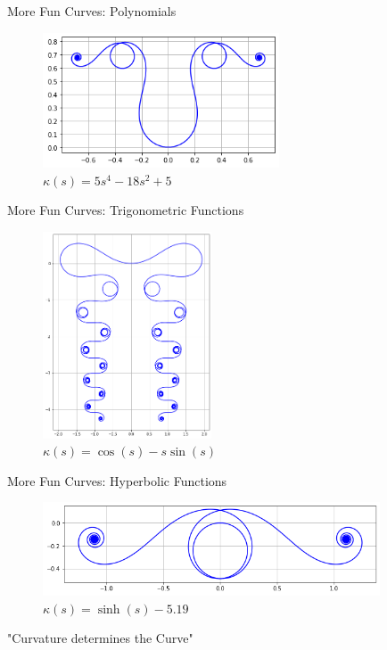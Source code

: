\documentclass{beamer}
\begin{document}
\begin{frame}{More Fun Curves: Polynomials}
	\begin{figure}
		\caption{$\kappa(s) = 5 s ^ 4 - 18 s ^ 2 + 5$}
		\centering
		\includegraphics[width=70mm, scale=0.5]{five_s^4.png}
	\end{figure}
\end{frame}

\begin{frame}{More Fun Curves: Trigonometric Functions}
	\begin{figure}
		\caption{$\kappa(s) = \cos(s) - s \sin(s)$}
		\centering
		\includegraphics[width=50mm, scale=0.2]{elegant_madness.png}
	\end{figure}
\end{frame}
	
\begin{frame}{More Fun Curves: Hyperbolic Functions}
	\begin{figure}
		\caption{$\kappa(s) = \sinh(s) - 5.19$}
		\centering
		\includegraphics[width=100mm, scale=0.5]{sinh.png}
	\end{figure}
\end{frame}


\begin{frame}{"Curvature determines the Curve"}
	
\end{frame}
\end{document}
